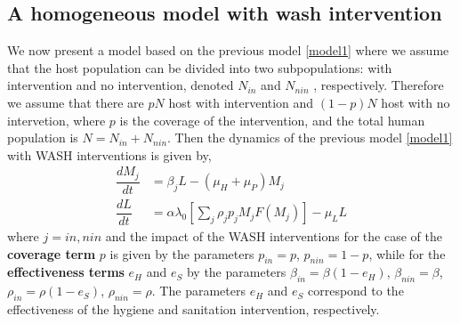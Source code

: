 \documentclass[12pt,a4paper]{article}
\theoremstyle{plain}%
\theoremstyle{definition}
\theoremstyle{remark}
\begin{document}
	\subsection{A homogeneous model with wash intervention}
	We now present a model based on the previous model \ref{model1} where we assume that the host population  can be divided into two subpopulations: with intervention and no intervention, denoted $N_{in}$  and $N_{nin}$ , respectively.
	Therefore we assume that there are $pN$  host  with intervention and  $(1-p)N$ host with no intervetion, where $p$ is
	the coverage of the intervention, and the total human population is $N = N_{in}  + N_{nin}$.
	Then the dynamics of the previous model \ref{model1} with WASH interventions is given by,
	\begin{equation}\label{model1wash}
	\begin{split}
	\dfrac{dM_j}{dt}&=\beta_j L - (\mu_H+\mu_P) M_j\\%
	\dfrac{dL}{dt}&= \alpha \lambda_0 \left[ \sum_j \rho_j p_j M_j F(M_j)\right]   - \mu_L L 
	\end{split}
	\end{equation} 
	where $j=in,nin$ 
	and the impact of the WASH interventions for the case of the  \textbf{coverage term} $p$ is given by the parameters $p_{in}=p$, $p_{nin}=1-p$, while for the \textbf{effectiveness terms} $e_H$ and $e_S$ by the parameters $\beta_{in}=\beta(1-e_H)$, $\beta_{nin}=\beta$, $\rho_{in}=\rho(1-e_S)$, $\rho_{nin}=\rho$.
	The parameters $e_H$ and $e_S$ correspond to the effectiveness of the hygiene and sanitation intervention, respectively.
	
\end{document}

